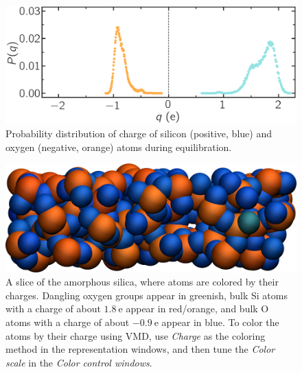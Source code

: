 \documentclass[9pt,tutorial]{livecoms}
\begin{document}
\begin{figure}
\includegraphics[width=\linewidth]{SIO-distribution}
\caption{Probability distribution of charge of silicon (positive, blue) and oxygen (negative, orange) atoms during equilibration.}
\label{fig:SIO-distribution}
\end{figure}

\begin{figure}
\includegraphics[width=\linewidth]{SIO-slice}
\caption{A slice of the amorphous silica, where atoms are colored by their charges. Dangling oxygen groups appear in greenish, bulk Si atoms with a charge of about $1.8~\text{e}$  appear in red/orange, and bulk O atoms with a charge of about $-0.9~\text{e}$ appear in blue. To color the atoms by their charge using VMD, use \textit{Charge} as the coloring method in the representation windows, and then tune the \textit{Color scale} in the \textit{Color control windows}.}
\label{fig:SIO-slice}
\end{figure}
\end{document}
